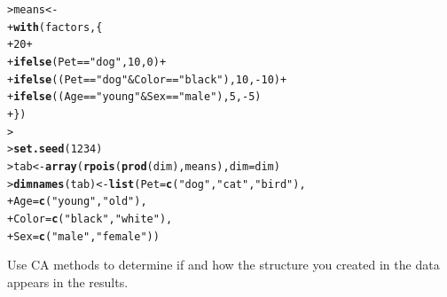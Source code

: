 \documentclass[10pt]{report}\usepackage[]{graphicx}\usepackage[]{color}
\makeatletter
\newcommand{\hlnum}[1]{\textcolor[rgb]{0.686,0.059,0.569}{#1}}%
\newcommand{\hlstr}[1]{\textcolor[rgb]{0.192,0.494,0.8}{#1}}%
\newcommand{\hlopt}[1]{\textcolor[rgb]{0,0,0}{#1}}%
\newcommand{\hlstd}[1]{\textcolor[rgb]{0.345,0.345,0.345}{#1}}%
\newcommand{\hlkwb}[1]{\textcolor[rgb]{0.69,0.353,0.396}{#1}}%
\newcommand{\hlkwc}[1]{\textcolor[rgb]{0.333,0.667,0.333}{#1}}%
\newcommand{\hlkwd}[1]{\textcolor[rgb]{0.737,0.353,0.396}{\textbf{#1}}}%
\newenvironment{kframe}{%
 \def\at@end@of@kframe{}%
 \ifinner\ifhmode%
  \def\at@end@of@kframe{\end{minipage}}%
  \begin{minipage}{\columnwidth}%
 \fi\fi%
 \def\FrameCommand##1{\hskip\@totalleftmargin \hskip-\fboxsep
 \colorbox{shadecolor}{##1}\hskip-\fboxsep
     \hskip-\linewidth \hskip-\@totalleftmargin \hskip\columnwidth}%
 \MakeFramed {\advance\hsize-\width
   \@totalleftmargin\z@ \linewidth\hsize
   \@setminipage}}%
 {\par\unskip\endMakeFramed%
 \at@end@of@kframe}
\newenvironment{knitrout}{}{} %
\renewenvironment{knitrout}{\small\renewcommand{\baselinestretch}{.85}}{} %
\makeatother
\begin{document}
\begin{Exercises}
\begin{enumerate*}
\begin{ans}
\begin{knitrout}
\begin{kframe}
\begin{alltt}
\hlstd{> }\hlstd{means} \hlkwb{<-}
\hlstd{+ }\hlkwd{with}\hlstd{(factors, \{}
\hlstd{+ }       \hlnum{20} \hlopt{+}
\hlstd{+ }       \hlkwd{ifelse}\hlstd{(Pet}\hlopt{==}\hlstr{"dog"}\hlstd{,} \hlnum{10}\hlstd{,} \hlnum{0}\hlstd{)} \hlopt{+}
\hlstd{+ }       \hlkwd{ifelse}\hlstd{((Pet}\hlopt{==}\hlstr{"dog"} \hlopt{&} \hlstd{Color}\hlopt{==}\hlstr{"black"}\hlstd{),} \hlnum{10}\hlstd{,} \hlopt{-}\hlnum{10}\hlstd{)} \hlopt{+}
\hlstd{+ }       \hlkwd{ifelse}\hlstd{((Age}\hlopt{==}\hlstr{"young"} \hlopt{&} \hlstd{Sex}\hlopt{==}\hlstr{"male"}\hlstd{),} \hlnum{5}\hlstd{,} \hlopt{-}\hlnum{5}\hlstd{)}
\hlstd{+ }       \hlstd{\})}
\hlstd{> }                 
\hlstd{> }\hlkwd{set.seed}\hlstd{(}\hlnum{1234}\hlstd{)}
\hlstd{> }\hlstd{tab} \hlkwb{<-} \hlkwd{array}\hlstd{(}\hlkwd{rpois}\hlstd{(}\hlkwd{prod}\hlstd{(dim), means),} \hlkwc{dim}\hlstd{=dim)}
\hlstd{> }\hlkwd{dimnames}\hlstd{(tab)} \hlkwb{<-} \hlkwd{list}\hlstd{(}\hlkwc{Pet}\hlstd{=}\hlkwd{c}\hlstd{(}\hlstr{"dog"}\hlstd{,}\hlstr{"cat"}\hlstd{,}\hlstr{"bird"}\hlstd{),}
\hlstd{+ }                      \hlkwc{Age}\hlstd{=}\hlkwd{c}\hlstd{(}\hlstr{"young"}\hlstd{,}\hlstr{"old"}\hlstd{),}
\hlstd{+ }                      \hlkwc{Color}\hlstd{=}\hlkwd{c}\hlstd{(}\hlstr{"black"}\hlstd{,} \hlstr{"white"}\hlstd{),}
\hlstd{+ }                      \hlkwc{Sex}\hlstd{=}\hlkwd{c}\hlstd{(}\hlstr{"male"}\hlstd{,} \hlstr{"female"}\hlstd{))}
\end{alltt}
\end{kframe}
\end{knitrout}
    \end{ans}
    
    \item Use CA methods to determine if and how the structure you created in the data appears in
    the results.
    \begin{ans}
    \end{ans}
    
  \end{enumerate*}
  

\end{Exercises}
\end{document}
